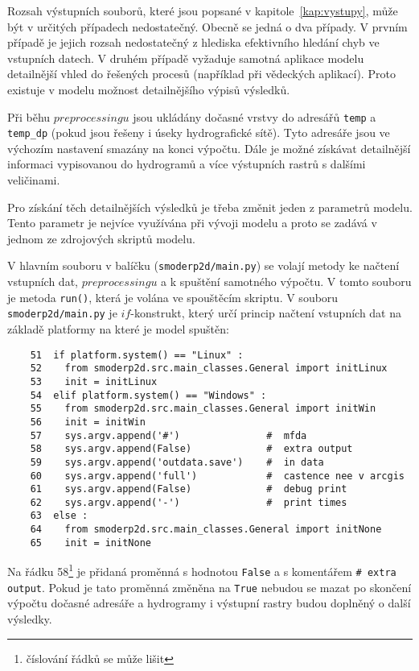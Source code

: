 


Rozsah výstupních souborů, které jsou popsané v kapitole~\ref{kap:vystupy}, může být v určitých případech nedostatečný. Obecně se jedná o dva případy. V prvním případě je jejich rozsah nedostatečný z hlediska efektivního hledání chyb ve vstupních datech. V druhém případě vyžaduje samotná aplikace modelu  detailnější vhled do řešených procesů (například při vědeckých aplikací). Proto existuje v modelu \smod možnost detailnějšího výpisů výsledků. 

Při běhu $preprocessingu$ jsou ukládány dočasné vrstvy do adresářů {\tt temp} a {\tt temp\_dp} (pokud jsou řešeny i úseky hydrografické sítě). Tyto adresáře jsou ve výchozím nastavení smazány na konci výpočtu. Dále je možné získávat detailnější informaci vypisovanou do hydrogramů a více výstupních rastrů s dalšími veličinami.

Pro získání těch detailnějších výsledků je třeba změnit jeden z parametrů modelu. Tento parametr je nejvíce využívána při vývoji modelu a proto se zadává v jednom ze zdrojových skriptů modelu. 

V hlavním souboru v balíčku \smod ({\tt smoderp2d/main.py}) se volají metody ke načtení vstupních dat, $preprocessingu$ a k spuštění samotného výpočtu. V tomto souboru je metoda {\tt run()}, která je volána ve spouštěcím skriptu. V souboru {\tt smoderp2d/main.py} je $if$-konstrukt, který určí princip načtení vstupních dat na základě platformy na které je model spuštěn:

    \begin{lstlisting}
    51  if platform.system() == "Linux" :
    52    from smoderp2d.src.main_classes.General import initLinux
    53    init = initLinux
    54  elif platform.system() == "Windows" :
    55    from smoderp2d.src.main_classes.General import initWin
    56    init = initWin
    57    sys.argv.append('#')               #  mfda
    58    sys.argv.append(False)             #  extra output
    59    sys.argv.append('outdata.save')    #  in data
    60    sys.argv.append('full')            #  castence nee v arcgis
    61    sys.argv.append(False)             #  debug print
    62    sys.argv.append('-')               #  print times
    63  else :
    64    from smoderp2d.src.main_classes.General import initNone
    65    init = initNone
    \end{lstlisting}
%     
Na řádku 58\footnote{číslování řádků se může lišit} je přidaná proměnná s hodnotou {\tt False} a s komentářem {\tt \#  extra output}. Pokud je tato proměnná změněna na {\tt True} nebudou se mazat po skončení výpočtu dočasné adresáře a hydrogramy i výstupní rastry budou doplněný o další výsledky. 




    
    